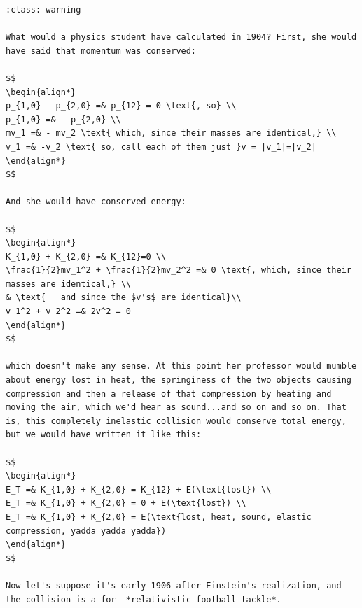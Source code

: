 \documentclass[
]{article}
\begin{document}
\begin{verbatim}
:class: warning

What would a physics student have calculated in 1904? First, she would have said that momentum was conserved:

$$
\begin{align*}
p_{1,0} - p_{2,0} =& p_{12} = 0 \text{, so} \\
p_{1,0} =& - p_{2,0} \\
mv_1 =& - mv_2 \text{ which, since their masses are identical,} \\
v_1 =& -v_2 \text{ so, call each of them just }v = |v_1|=|v_2|
\end{align*}
$$

And she would have conserved energy:

$$
\begin{align*}
K_{1,0} + K_{2,0} =& K_{12}=0 \\
\frac{1}{2}mv_1^2 + \frac{1}{2}mv_2^2 =& 0 \text{, which, since their masses are identical,} \\
& \text{   and since the $v's$ are identical}\\
v_1^2 + v_2^2 =& 2v^2 = 0
\end{align*}
$$

which doesn't make any sense. At this point her professor would mumble about energy lost in heat, the springiness of the two objects causing compression and then a release of that compression by heating and moving the air, which we'd hear as sound...and so on and so on. That is, this completely inelastic collision would conserve total energy, but we would have written it like this:

$$
\begin{align*}
E_T =& K_{1,0} + K_{2,0} = K_{12} + E(\text{lost}) \\
E_T =& K_{1,0} + K_{2,0} = 0 + E(\text{lost}) \\
E_T =& K_{1,0} + K_{2,0} = E(\text{lost, heat, sound, elastic compression, yadda yadda yadda})
\end{align*}
$$

Now let's suppose it's early 1906 after Einstein's realization, and the collision is a for  *relativistic football tackle*.
\end{verbatim}
\end{document}
